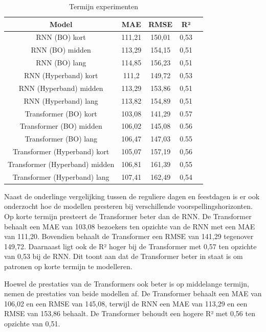 \begin{table}[H]
    \centering
    \begin{tabular}{|c|c|c|c|c|}
        \hline
        \textbf{Model} & MAE & RMSE & R² \\ \hline
        RNN (BO) kort & 111,21  & 150,01 & 0,53  \\ \hline
        RNN (BO) midden & 113,29  & 154,15 & 0,51  \\ \hline
        RNN (BO) lang & 114,85  & 156,23 & 0,51  \\ \hline
        RNN (Hyperband) kort & 111,2  & 149,72 & 0,53  \\ \hline
        RNN (Hyperband) midden & 113,29  & 153,86 & 0,51  \\ \hline
        RNN (Hyperband) lang & 113,82  & 154,89 & 0,51  \\ \hline
        Transformer (BO) kort & 103,08  & 141,29 & 0.57  \\ \hline
        Transformer (BO) midden & 106,02  & 145,08 & 0.56 \\ \hline
        Transformer (BO) lang & 106,47  & 147,03 & 0.55  \\ \hline
        Transformer (Hyperband) kort & 105,07  & 157,19 & 0,56  \\ \hline
        Transformer (Hyperband) midden & 106,81  & 161,39 & 0,55  \\ \hline
        Transformer (Hyperband) lang & 107,41  & 162,49 & 0,54  \\ \hline
    \end{tabular}
    \caption{Termijn experimenten}
\end{table}
Naast de onderlinge vergelijking tussen de reguliere dagen en feestdagen is er ook onderzocht hoe de modellen presteren bij verschillende voorspellingshorizonten. Op korte termijn presteert de Transformer beter dan de RNN. De Transformer behaalt een MAE van 103,08 bezoekers ten opzichte van de RNN met een MAE van 111,20. Bovendien behaalt de Transformer een RMSE van 141,29 tegenover 149,72. Daarnaast ligt ook de R² hoger bij de Transformer met 0,57 ten opzichte van 0,53 bij de RNN. Dit toont aan dat de Transformer beter in staat is om patronen op korte termijn te modelleren.

Hoewel de prestaties van de Transformers ook beter is op middelange termijn, nemen de prestaties van beide modellen af. De Transformer behaalt een MAE van 106,02 en een RMSE van 145,08, terwijl de RNN een MAE van 113,29 en een RMSE van 153,86 behaalt. De Transformer behoudt een hogere R² met 0,56 ten opzichte van 0,51.


